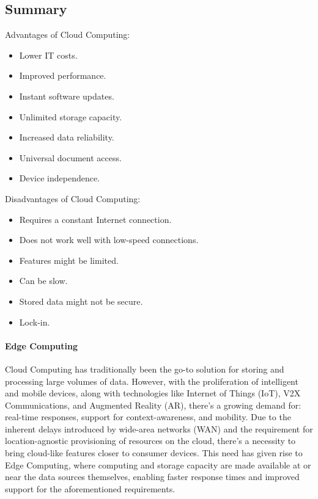 \subsection{Summary}
Advantages of Cloud Computing:
\begin{itemize}
    \item Lower IT costs.
    \item Improved performance.
    \item Instant software updates.
    \item Unlimited storage capacity.
    \item Increased data reliability.
    \item Universal document access.
    \item Device independence.
\end{itemize}
Disadvantages of Cloud Computing:
\begin{itemize}
    \item Requires a constant Internet connection.
    \item Does not work well with low-speed connections.
    \item Features might be limited.
    \item Can be slow.
    \item Stored data might not be secure.
    \item Lock-in.
\end{itemize}

\paragraph*{Edge Computing}
Cloud Computing has traditionally been the go-to solution for storing and processing large volumes of data. 
However, with the proliferation of intelligent and mobile devices, along with technologies like Internet of Things (IoT), V2X Communications, and Augmented Reality (AR), there's a growing demand for: real-time responses, support for context-awareness, and mobility. 
Due to the inherent delays introduced by wide-area networks (WAN) and the requirement for location-agnostic provisioning of resources on the cloud, there's a necessity to bring cloud-like features closer to consumer devices.
This need has given rise to Edge Computing, where computing and storage capacity are made available at or near the data sources themselves, enabling faster response times and improved support for the aforementioned requirements.